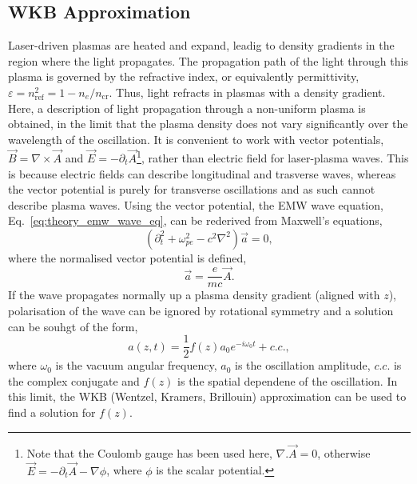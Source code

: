 \subsection{WKB Approximation}%
\label{sec:theory_WKB}

Laser-driven plasmas are heated and expand, leadig to density gradients in the region where the light propagates.
The propagation path of the light through this plasma is governed by the refractive index, or equivalently permittivity, $\varepsilon = n_{\text{ref}}^2=1-n_e/n_{\text{cr}}$.
Thus, light refracts in plasmas with a density gradient.
Here, a description of light propagation through a non-uniform plasma is obtained, in the limit that the plasma density does not vary significantly over the wavelength of the oscillation.
It is convenient to work with vector potentials, $\vec{B} = \nabla\times\vec{A}$ and $\vec{E} = -\partial_t\vec{A}$\footnote{Note that the Coulomb gauge has been used here, $\nabla.\vec{A}=0$, otherwise $\vec{E}=-\partial_t\vec{A}-\nabla\phi$, where $\phi$ is the scalar potential.}, rather than electric field for laser-plasma waves.
This is because electric fields can describe longitudinal and trasverse waves, whereas the vector potential is purely for transverse oscillations and as such cannot describe plasma waves.
Using the vector potential, the \ac{EMW} wave equation, Eq.~\ref{eq:theory_emw_wave_eq}, can be rederived from Maxwell's equations,
\begin{equation}
    \label{eq:theory_waveeq_a}
    \left( \partial_t^2 + \omega_{pe}^2 - c^2\nabla^2 \right)\vec{a} = 0,
\end{equation}
where the normalised vector potential is defined,
\begin{equation}
    \vec{a} = \frac{e}{m c}\vec{A}.
\end{equation}
If the wave propagates normally up a plasma density gradient (aligned with $z$), polarisation of the wave can be ignored by rotational symmetry and a solution can be souhgt of the form,
\begin{equation}
    \label{eq:theory_fz}
    a(z,t) = \frac{1}{2} f(z) a_0e^{-i\omega_0 t} + c.c.,
\end{equation}
where $\omega_0$ is the vacuum angular frequency, $a_0$ is the oscillation amplitude, $c.c.$ is the complex conjugate and $f(z)$ is the spatial dependene of the oscillation.
In this limit, the WKB (Wentzel, Kramers, Brillouin) approximation can be used to find a solution for $f(z)$.


